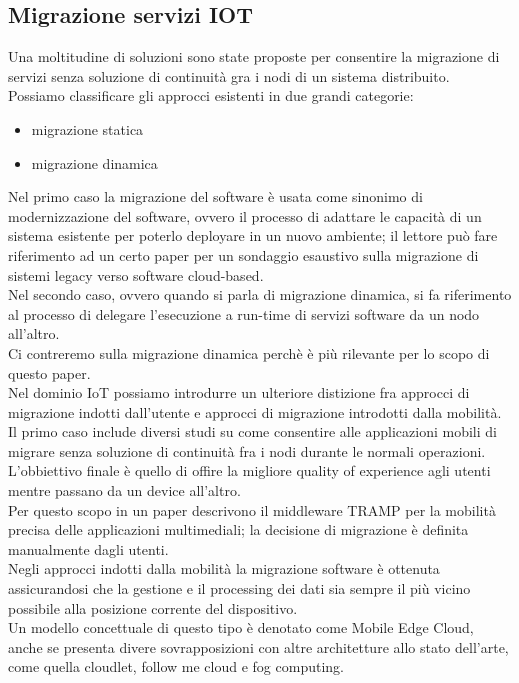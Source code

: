 \documentclass[11pt]{article}
\begin{document}
	\subsection{Migrazione servizi IOT}
	Una moltitudine di soluzioni sono state proposte per consentire la migrazione di servizi senza soluzione di continuità gra i nodi di un sistema distribuito. \\
	Possiamo classificare gli approcci esistenti in due grandi categorie:
	\begin{itemize}
		\item migrazione statica
		\item migrazione dinamica
	\end{itemize}
	Nel primo caso la migrazione del software è usata come sinonimo di modernizzazione del software, ovvero il processo di adattare le capacità di un sistema esistente per poterlo deployare in un nuovo ambiente; il lettore può fare riferimento ad un certo paper per un sondaggio esaustivo sulla migrazione di sistemi legacy verso software cloud-based. \\
	Nel secondo caso, ovvero quando si parla di migrazione dinamica, si fa riferimento al processo di delegare l'esecuzione a run-time di servizi software da un nodo all'altro. \\
	Ci contreremo sulla migrazione dinamica perchè è più rilevante per lo scopo di questo paper. \\
	Nel dominio IoT possiamo introdurre un ulteriore distizione fra approcci di migrazione indotti dall'utente e approcci di migrazione introdotti dalla mobilità. \\
	Il primo caso include diversi studi su come consentire alle applicazioni mobili di migrare senza soluzione di continuità fra i nodi durante le normali operazioni.\\
	L'obbiettivo finale è quello di offire la migliore quality of experience agli utenti mentre passano da un device all'altro.  \\
	Per questo scopo in un paper descrivono il middleware TRAMP per la mobilità precisa delle applicazioni multimediali; la decisione di migrazione è definita manualmente dagli utenti. \\
	Negli approcci indotti dalla mobilità la migrazione software è ottenuta assicurandosi che la gestione e il processing dei dati sia sempre il più vicino possibile alla posizione corrente del dispositivo. \\
	Un modello concettuale di questo tipo è denotato come Mobile Edge Cloud, anche se presenta divere sovrapposizioni con altre architetture allo stato dell'arte, come quella cloudlet, follow me cloud e fog computing. \\
\end{document}
